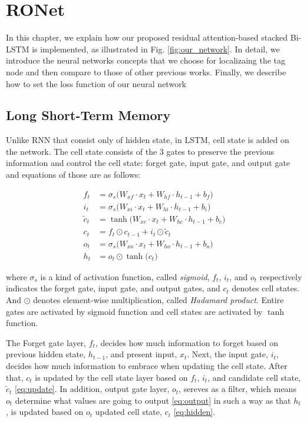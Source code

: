 \documentclass[letterpaper, 10 pt, conference]{ieeeconf}  %
\begin{document}
 
\section{RONet}

In this chapter, we explain how our proposed residual attention-based stacked Bi-LSTM is implemented, as illustrated in Fig. \ref{fig:our_network}. 
In detail, we introduce the neural networks concepts that we choose for localizaing the tag node and then compare to those of other previous works. Finally, we describe how to set the loss function of our neural network 

\subsection{Long Short-Term Memory}

Unlike RNN that consist only of hidden state, in LSTM, cell state is added on the network. The cell state consists of the 3 gates to preserve the previous information and control the cell state: forget gate, input gate, and output gate and equations of those are as follows:


\begin{align}
f_{t} & =\sigma _{s}\big(W_{xf}\cdot x_{t}+W_{hf}\cdot h_{t-1}+b_{f}\big)\label{eq:forget}\\
i_{t} & =\sigma _{s}\big(W_{xi}\cdot x_{t}+W_{hi}\cdot h_{t-1}+b_{i}\big)\label{eq:input}\\
\tilde{c}_{t} & = \tanh\big(W_{xc}\cdot x_{t}+W_{hc}\cdot h_{t-1}+b_{c}\big)\label{eq:new_cell}\\
c_{t} & =f_{t}\odot c_{t-1}+i_{t}\odot\tilde{c}_{t}\label{eq:update}\\
o_{t} & =\sigma _{s}\big(W_{xo}\cdot x_{t}+W_{ho}\cdot h_{t-1}+b_{o}\big)\label{eq:output}\\
h_{t} & =o_{t}\odot \tanh\big(c_{t}\big)\label{eq:hidden}
\end{align}

where $\sigma _{s}$ is a kind of activation function, called \textit{sigmoid},  $f_{t}$, $i_{t}$, and $o_{t}$ respectively indicates the forget gate, input gate, and output gates, and $c_{t}$ denotes cell states. And $\odot$ denotes element-wise multiplication, called \textit{Hadamard product}. Entire gates are activated by sigmoid function and cell states are activated by $\tanh$ function.

The Forget gate layer, $f_{t}$, decides how much information to forget based on previous hidden state, $h_{t-1}$, and present input, $x_{t}$. Next, the input gate, $i_{t}$, decides how much information to embrace when updating the cell state. After that, $c_{t}$ is updated by the cell state layer based on $f_{t}$, $i_{t}$, and candidate cell state, $\tilde{c}_{t}$ \eqref{eq:update}. In addition, output gate layer, $o_{t}$, sereves as a filter, which means $o_{t}$ determine what values are going to output \eqref{eq:output} in such a way as that $h_{t}$, is updated based on $o_{t}$ updated cell state, $c_{t}$ \eqref{eq:hidden}. 
\end{document}
